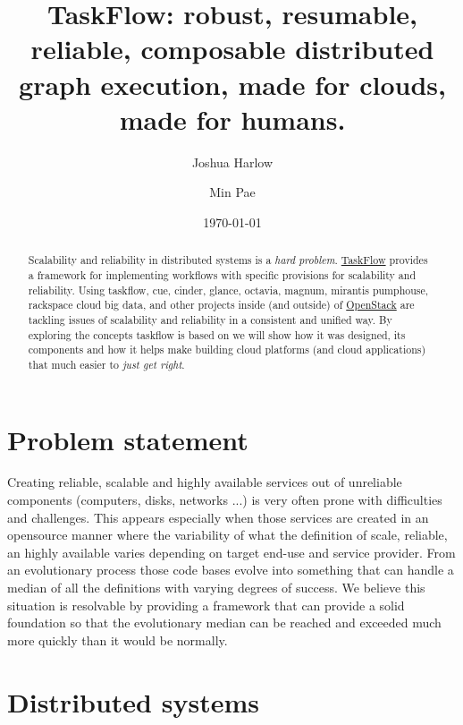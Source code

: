 \documentclass[11pt,a4paper]{article}
\begin{document}
\title{TaskFlow: robust, resumable, reliable, composable distributed graph
       execution, made for clouds, made for humans.}

\date{\today}

\author[1]{Joshua Harlow}
\author[2]{Min Pae}

\maketitle

\begin{abstract}

Scalability and reliability in distributed systems is a \emph{hard problem}.
\href{http://docs.openstack.org/developer/taskflow/}{TaskFlow} provides
a framework for implementing workflows with specific provisions for scalability
and reliability. Using taskflow, cue, cinder, glance, octavia, magnum,
mirantis pumphouse, rackspace cloud big data, and other projects inside (and
outside) of \href{http://www.openstack.org/}{OpenStack} are tackling issues of
scalability and reliability in a consistent and unified way. By exploring
the concepts taskflow is based on we will show how it was designed, its
components and how it helps make building cloud platforms (and cloud
applications) that much easier to \emph{just get right}.

\end{abstract}

\section{Problem statement}

Creating reliable, scalable and highly available services out of unreliable
components (computers, disks, networks ...) is very often prone with
difficulties and challenges. This appears especially when those services are
created in an opensource manner where the variability of what the definition
of scale, reliable, an highly available varies depending on target end-use
and service provider. From an evolutionary process those code bases
evolve into something that can handle a median of all the definitions with
varying degrees of success. We believe this situation is resolvable
by providing a framework that can provide a solid foundation so that the
evolutionary median can be reached and exceeded much more quickly than it
would be normally.

\section{Distributed systems}
\end{document}
